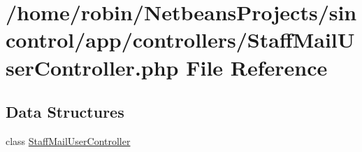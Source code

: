 \hypertarget{_staff_mail_user_controller_8php}{}\section{/home/robin/\+Netbeans\+Projects/sincontrol/app/controllers/\+Staff\+Mail\+User\+Controller.php File Reference}
\label{_staff_mail_user_controller_8php}
\subsection*{Data Structures}
\begin{DoxyCompactItemize}
\item 
class \hyperlink{class_staff_mail_user_controller}{Staff\+Mail\+User\+Controller}
\end{DoxyCompactItemize}
